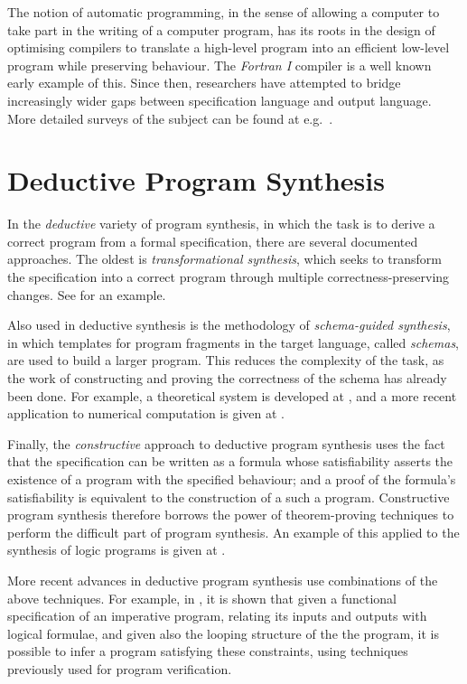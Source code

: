 \documentclass[a4paper,twoside,notitlepage]{report}
\begin{document}
The notion of automatic programming, in the sense of 
allowing a computer to take part in the writing of a computer program, has its 
roots in the design of optimising compilers to translate a high-level program 
into an efficient low-level program while preserving behaviour. The 
\emph{Fortran I} compiler\cite{fortran} is a well known early example of this. 
Since then, researchers have attempted to bridge increasingly wider gaps 
between specification language and output language. More detailed surveys of 
the subject can be found at e.g.\ 
\cite{goldberg86}\cite{deville94}\cite{basin04}.

\section{Deductive Program Synthesis}

In the \emph{deductive} variety of program synthesis, in which the task is to 
derive a correct program from a formal specification, there are several 
documented approaches. The oldest is \emph{transformational synthesis}, which 
seeks to transform the specification into a correct program through multiple 
correctness-preserving changes. See \cite{cheatham86} for an example.

Also used in deductive synthesis is the methodology of \emph{schema-guided 
synthesis}, in which templates for program fragments in the target language, 
called \emph{schemas}, are used to build a larger program. This reduces the 
complexity of the task, as the work of constructing and proving the 
correctness of the schema has already been done. For example, a theoretical 
system is developed at \cite{flener97}, and a more recent application to 
numerical computation is given at \cite{colon05}.

Finally, the \emph{constructive} approach to deductive program synthesis uses 
the fact that the specification can be written as a formula whose 
satisfiability asserts the existence of a program with the specified 
behaviour; and a proof of the formula's satisfiability is equivalent to the 
construction of a such a program. Constructive program synthesis therefore 
borrows the power of theorem-proving techniques to perform the difficult part 
of program synthesis. An example of this applied to the synthesis of logic 
programs is given at \cite{bundy90}.

More recent advances in deductive program synthesis use combinations of the 
above techniques. For example, in \cite{popl10syn}, it is shown that given a 
functional specification of an imperative program, relating its inputs and 
outputs with logical formulae, and given also the looping structure of the the 
program, it is possible to infer a program satisfying these constraints, using 
techniques previously used for program verification.
\end{document}

